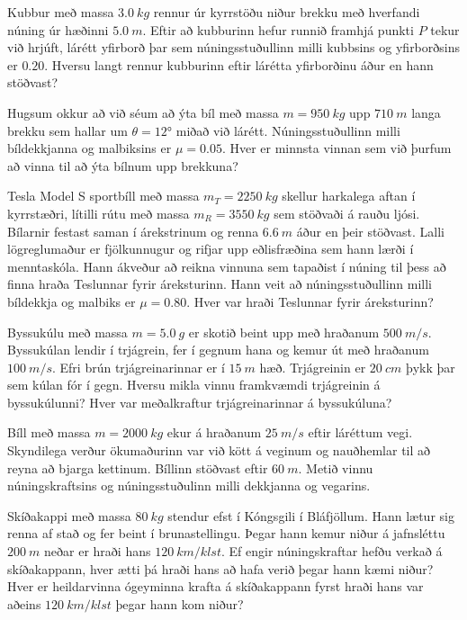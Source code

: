\ifdefined \wholebook \else\documentclass[oneside]{book}\usepackage{EdlBook}\graphicspath{{figures/}}
\begin{document}
\begin{enumerate}[label = \textbf{Dæmi \thechapter.\arabic*.}]
\begin{minipage}{\linewidth}
    \item Kubbur með massa $\SI{3.0}{kg}$ rennur úr kyrrstöðu niður brekku með hverfandi núning úr hæðinni $\SI{5.0}{m}$. Eftir að kubburinn hefur runnið framhjá punkti $P$ tekur við hrjúft, lárétt yfirborð þar sem núningsstuðullinn milli kubbsins og yfirborðsins er $0.20$. Hversu langt rennur kubburinn eftir lárétta yfirborðinu áður en hann stöðvast?

\end{minipage}

\item Hugsum okkur að við séum að ýta bíl með massa $m = \SI{950}{kg}$ upp $\SI{710}{m}$ langa brekku sem hallar um $\theta = \ang{12}$ miðað við lárétt. Núningsstuðullinn milli bíldekkjanna og malbiksins er $\mu = 0.05$. Hver er minnsta vinnan sem við þurfum að vinna til að ýta bílnum upp brekkuna?


\item Tesla Model S sportbíll með massa $m_T = \SI{2250}{kg}$ skellur harkalega aftan í kyrrstæðri, lítilli rútu með massa $m_R = \SI{3550}{kg}$ sem stöðvaði á rauðu ljósi. Bílarnir festast saman í árekstrinum og renna $\SI{6.6}{m}$ áður en þeir stöðvast. Lalli lögreglumaður er fjölkunnugur og rifjar upp eðlisfræðina sem hann lærði í menntaskóla. Hann ákveður að reikna vinnuna sem tapaðist í núning til þess að finna hraða Teslunnar fyrir áreksturinn. Hann veit að núningsstuðullinn milli bíldekkja og malbiks er $\mu = 0.80$. Hver var hraði Teslunnar fyrir áreksturinn?


\item Byssukúlu með massa $m = \SI{5.0}{g}$ er skotið beint upp með hraðanum $\SI{500}{m/s}$. Byssukúlan lendir í trjágrein, fer í gegnum hana og kemur út með hraðanum $\SI{100}{m/s}$. Efri brún trjágreinarinnar er í $\SI{15}{m}$ hæð. Trjágreinin er $\SI{20}{cm}$ þykk þar sem kúlan fór í gegn. Hversu mikla vinnu framkvæmdi trjágreinin á byssukúlunni? Hver var meðalkraftur trjágreinarinnar á byssukúluna?

\item Bíll með massa $m = \SI{2000}{kg}$ ekur á hraðanum $\SI{25}{m/s}$ eftir láréttum vegi. Skyndilega verður ökumaðurinn var við kött á veginum og nauðhemlar til að reyna að bjarga kettinum. Bíllinn stöðvast eftir $\SI{60}{m}$. Metið vinnu núningskraftsins og núningsstuðulinn milli dekkjanna og vegarins.
    

\item Skíðakappi með massa $\SI{80}{kg}$ stendur efst í Kóngsgili í Bláfjöllum. Hann lætur sig renna af stað og fer beint í brunastellingu. Þegar hann kemur niður á jafnsléttu $\SI{200}{m}$ neðar er hraði hans $\SI{120}{km/klst}$. Ef engir núningskraftar hefðu verkað á skíðakappann, hver ætti þá hraði hans að hafa verið þegar hann kæmi niður? Hver er heildarvinna ógeyminna krafta á skíðakappann fyrst hraði hans var aðeins $\SI{120}{km/klst}$ þegar hann kom niður?


\end{enumerate}
\end{document}
